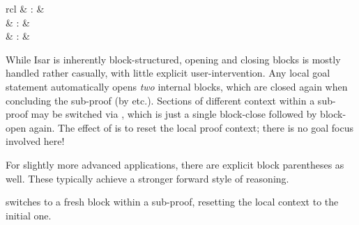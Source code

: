\begin{isabellebody}
\begin{isamarkuptext}
\begin{description}
  \end{description}%
\end{isamarkuptext}%
\isamarkuptrue%
%
\isamarkuptrue%
%
\begin{isamarkuptext}%
\begin{matharray}{rcl}
    \hypertarget{command.next}{\hyperlink{command.next}{\mbox{}}} & : &  \\
    \hypertarget{command.braceleft}{\hyperlink{command.braceleft}{\mbox{\isa{\isacommand{{\isacharbraceleft}}}}}} & : &  \\
    \hypertarget{command.braceright}{\hyperlink{command.braceright}{\mbox{\isa{\isacommand{{\isacharbraceright}}}}}} & : &  \\
  \end{matharray}

  While Isar is inherently block-structured, opening and closing
  blocks is mostly handled rather casually, with little explicit
  user-intervention.  Any local goal statement automatically opens
  \emph{two} internal blocks, which are closed again when concluding
  the sub-proof (by \hyperlink{command.qed}{\mbox{}} etc.).  Sections of different
  context within a sub-proof may be switched via \hyperlink{command.next}{\mbox{}},
  which is just a single block-close followed by block-open again.
  The effect of \hyperlink{command.next}{\mbox{}} is to reset the local proof context;
  there is no goal focus involved here!

  For slightly more advanced applications, there are explicit block
  parentheses as well.  These typically achieve a stronger forward
  style of reasoning.

  \begin{description}

  \item \hyperlink{command.next}{\mbox{}} switches to a fresh block within a
  sub-proof, resetting the local context to the initial one.


\end{description}
\end{isamarkuptext}
\end{isabellebody}
